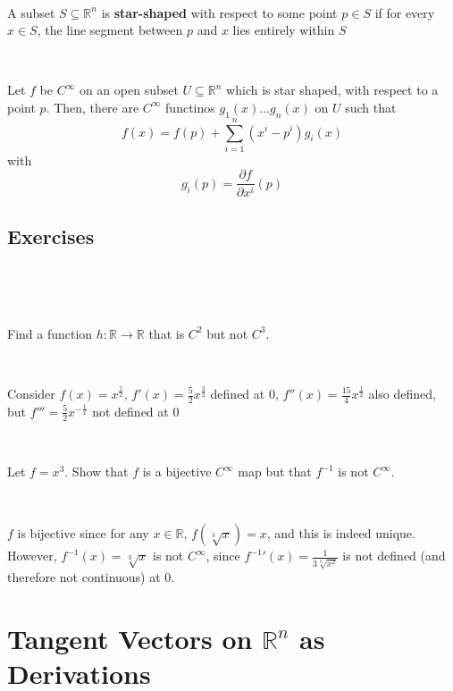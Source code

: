 \documentclass{article}
\begin{document}
\begin{definition}
  \

  A subset $S \subseteq \mathbb{R}^n$ is \textbf{star-shaped} with respect to some point $p \in S$ if for every $x \in S$, the line segment between $p$ and $x$ lies entirely within $S$
\end{definition}

\begin{lemma}
  \

  Let $f$ be $C^\infty$ on an open subset $U \subseteq \mathbb{R}^n$ which is star shaped, with respect to a point $p$. Then, there are $C^\infty$ functinos $g_1(x) \dots g_n(x)$ on $U$ such that $$f(x) = f(p) + \sum_{i=1}^n (x^i - p^i)g_i(x)$$with $$g_i(p) = \frac{\partial f}{\partial x^i}(p)$$
\end{lemma}

\subsection{Exercises}
\

\begin{exercise}[1.1]
  \

  Find a function $h: \mathbb{R} \to \mathbb{R}$ that is $C^2$ but not $C^3$.
\end{exercise}

\begin{solution}
  \

  Consider $f(x) = x^\frac{5}{2}$, $f'(x) = \frac{5}{2}x^\frac{3}{2}$ defined at $0$, $f''(x) = \frac{15}{4}x^\frac{1}{2}$ also defined, but $f''' = \frac{5}{2} x^{-\frac{1}{x}}$ not defined at $0$
\end{solution}

\begin{exercise}[1.7]
  \

  Let $f = x^3$. Show that $f$ is a bijective $C^\infty$ map but that $f ^{-1}$ is not $C^\infty$.
\end{exercise}

\begin{solution}
  \

  $f$ is bijective since for any $x \in \mathbb{R}$, $f(\sqrt[3]{x}) = x$, and this is indeed unique. However, $f ^{-1}(x) = \sqrt[3]{x}$ is not $C^\infty$, since ${f ^{-1}}'(x) = \frac{1}{3\sqrt[3]{x^2}}$ is not defined (and therefore not continuous) at $0$.
\end{solution}

\section{Tangent Vectors on $\mathbb{R}^n$ as Derivations}
\end{document}
